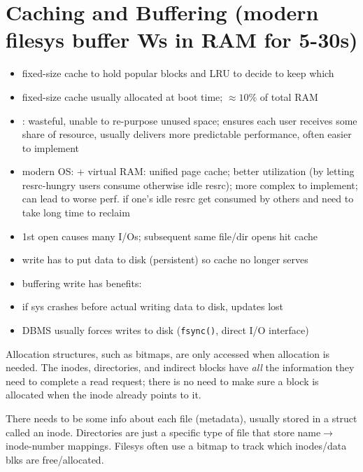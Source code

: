 \section*{Caching and Buffering (modern filesys buffer Ws in RAM for 5-30s)}
\begin{itemize}
\item fixed-size cache to hold popular blocks and LRU to decide to keep which
\item fixed-size cache usually allocated at boot time; $\approx 10\%$ of total RAM
\item {}: wasteful, unable to re-purpose unused space; ensures each user receives some share of resource, usually delivers more predictable performance, often easier to implement
\item modern OS:  + virtual RAM: unified page cache; better utilization (by letting resrc-hungry users consume otherwise idle resrc); more complex to implement; can lead to worse perf. if one's idle resrc get consumed by others and need to take long time to reclaim
\item 1st open causes many I/Os; subsequent same file/dir opens hit cache
\item write has to put data to disk (persistent) so cache no longer serves
\item buffering write has benefits:
\item if sys crashes before actual writing data to disk, updates lost
\item DBMS usually forces writes to disk (\texttt{fsync()}, direct I/O interface)
\end{itemize}
\begin{tcolorbox}[left=0mm, top=1mm, right=0mm, rightlower=0mm, bottom=1mm,
  title= Reads DON’T access allocation structures,
  halign title=center]
  Allocation structures, such as bitmaps, are only accessed when allocation is needed. The inodes, directories, and indirect blocks have \emph{all} the information they need to complete a read request; there is no need to make sure a block is allocated when the inode already points to it.
\end{tcolorbox}
There needs to be some info about each file (metadata), usually
stored in a struct called an inode. Directories are just a specific type
of file that store name$\to$inode-number mappings. Filesys often use a bitmap to track which inodes/data blks are free/allocated.
